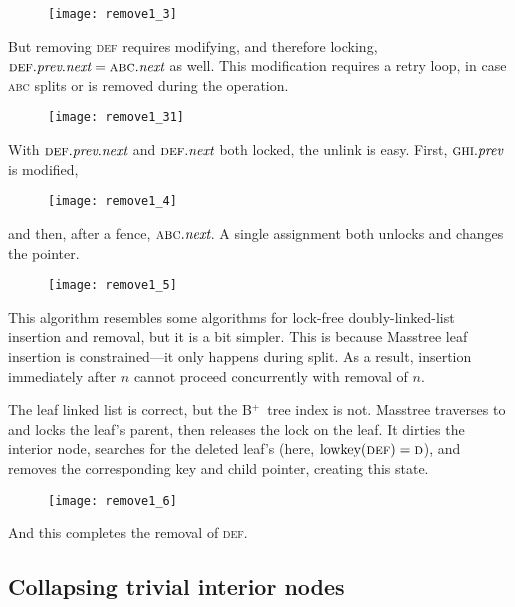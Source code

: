 \documentclass[11pt]{article}
\newcommand{\V}[1]{\textit{#1}}
\newcommand{\N}[1]{\text{\upshape{#1}}}
\newcommand{\Bplus}{B\(^+\)}
\newcommand{\ITEM}[1]{\textsc{#1}}
\begin{document}
\begin{figure}[H]
\texttt{[image: remove1\_3]}
\end{figure}

\noindent%
But removing \ITEM{def} requires modifying, and therefore locking,
\(\ITEM{def}.\V{prev}.\V{next} = \ITEM{abc}.\V{next}\) as well. This
modification requires a retry loop, in case \ITEM{abc} splits or is
removed during the operation.

\begin{figure}[H]
\texttt{[image: remove1\_31]}
\end{figure}

\noindent%
With \(\ITEM{def}.\V{prev}.\V{next}\) and \(\ITEM{def}.\V{next}\) both
locked, the unlink is easy. First, \(\ITEM{ghi}.\V{prev}\) is modified,

\begin{figure}[H]
\texttt{[image: remove1\_4]}
\end{figure}

\noindent%
and then, after a fence, \(\ITEM{abc}.\V{next}\). A single assignment
both unlocks and changes the pointer.

\begin{figure}[H]
\texttt{[image: remove1\_5]}
\end{figure}

\noindent%
This algorithm resembles some algorithms for lock-free
doubly-linked-list insertion and removal, but it is a bit simpler. This
is because Masstree leaf insertion is constrained---it only happens
during split. As a result, insertion immediately after \(n\) cannot
proceed concurrently with removal of \(n\).

The leaf linked list is correct, but the \Bplus\ tree index is not.
Masstree traverses to and locks the leaf's parent, then releases the
lock on the leaf. It dirties the interior node, searches for the deleted
leaf's \N{lowkey} (here, \(\N{lowkey}(\ITEM{def}) = \ITEM{d}\)), and removes
the corresponding key and child pointer, creating this state.

\begin{figure}[H]
\texttt{[image: remove1\_6]}
\end{figure}

And this completes the removal of \ITEM{def}.

\subsection{Collapsing trivial interior nodes}
\end{document}
